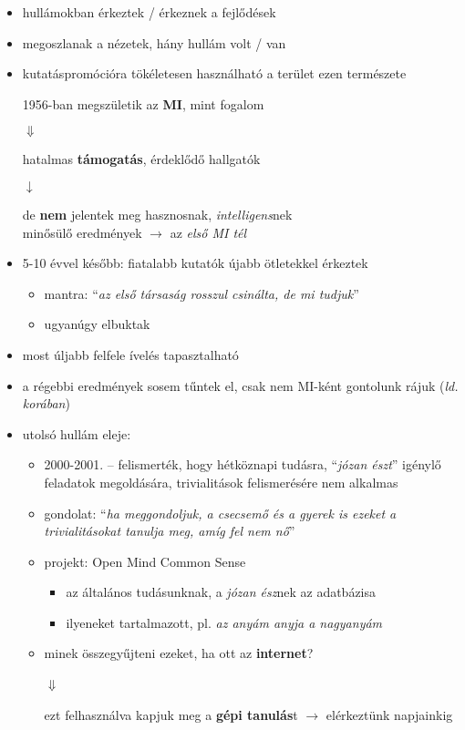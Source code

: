 \documentclass[a4paper, 11pt]{article}
\begin{document}
\begin{itemize}
	\item hullámokban érkeztek / érkeznek a fejlődések
	\item megoszlanak a nézetek, hány hullám volt / van
	\item kutatáspromócióra tökéletesen használható a terület ezen természete
	\begin{center}
		1956-ban megszületik az \textbf{MI}, mint fogalom
		
		$\Downarrow$
		
		hatalmas \textbf{támogatás}, érdeklődő hallgatók
		
		$\downarrow$
		
		de \textbf{nem} jelentek meg hasznosnak, \textit{intelligens}nek \\ minősülő eredmények $\to$ az \textit{első MI tél}
	\end{center}
	\item 5-10 évvel később: fiatalabb kutatók újabb ötletekkel érkeztek
	\begin{itemize}
		\item mantra: ``\textit{az első társaság rosszul csinálta, de mi tudjuk}''
		\item ugyanúgy elbuktak
	\end{itemize}
	\item most úljabb felfele ívelés tapasztalható
	\item  a régebbi eredmények sosem tűntek el, csak nem MI-ként gontolunk rájuk (\textit{ld. korában})
	\item utolsó hullám eleje:
	\begin{itemize}
		\item 2000-2001. -- felismerték, hogy hétköznapi tudásra, ``\textit{józan észt}'' igénylő feladatok megoldására, trivialitások felismerésére nem alkalmas
		\item gondolat: ``\textit{ha meggondoljuk, a csecsemő és a gyerek is ezeket a trivialitásokat tanulja meg, amíg fel nem nő}''
		\item projekt: Open Mind Common Sense
		\begin{itemize}
			\item az általános tudásunknak, a \textit{józan ész}nek az adatbázisa
			\item ilyeneket tartalmazott, pl. \textit{az anyám anyja a nagyanyám}
		\end{itemize}
		\item minek összegyűjteni ezeket, ha ott az \textbf{internet}?
		\begin{center}
			$\Downarrow$ ~~~~~~~~~~~~~~~~~~~~~~~~~~~~~~~~~
			
			ezt felhasználva kapjuk meg a \textbf{gépi tanulás}t $\to$ elérkeztünk napjainkig
		\end{center}
	\end{itemize}
\end{itemize}
\end{document}
